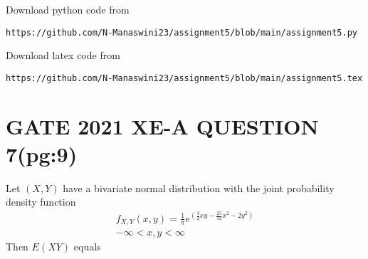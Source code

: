 \documentclass[journal,12pt,twocolumn]{IEEEtran}
\begin{document}
\renewcommand{\thefigure}{\theenumi}
\renewcommand{\thetable}{\theenumi}
Download python code from 
\begin{lstlisting}
https://github.com/N-Manaswini23/assignment5/blob/main/assignment5.py
\end{lstlisting}
%
Download latex code from 
\begin{lstlisting}
https://github.com/N-Manaswini23/assignment5/blob/main/assignment5.tex
\end{lstlisting}
%

\section*{GATE 2021 XE-A QUESTION 7(pg:9)}
Let $(X,Y)$ have a bivariate normal distribution with the joint probability density function
\begin{align}
f_{X,Y}(x,y)=\frac{1}{\pi}e^{(\frac{3}{2}xy-\frac{25}{32}x^2-2y^2)}\\
-\infty < x,y < \infty
\end{align}
Then $E(XY)$ equals 
\end{document}
